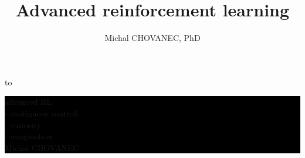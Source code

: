\documentclass[xcolor=dvipsnames]{beamer}
\title{\color{white} \bf Advanced reinforcement learning}
\author{\color{white} Michal CHOVANEC, PhD}
\date[EURP]{}
\begin{document}
{
    \usebackgroundtemplate
    {
        \vbox to 
    }



    \begin{frame}

    \centering
     \colorbox{black}
     {
        \begin{minipage}{7cm}
           {\LARGE advanced RL} \\
           {\Large - continuous controll \\- curiosity \\- imagination} \\
           {\LARGE Michal CHOVANEC} \\
       \end{minipage}
     }

    \end{frame}
}
\end{document}
